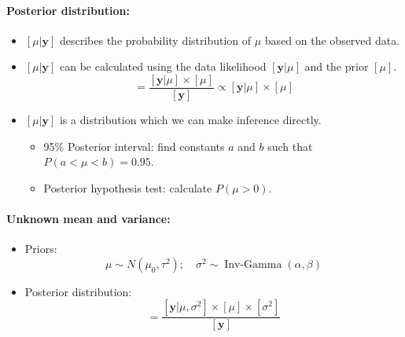\documentclass{article}
\begin{document}
\paragraph{Posterior distribution:}
\begin{itemize}
    \item $[\mu|\mathbf{y}]$ describes the probability distribution of $\mu$ based on the observed data.
    \item $[\mu|\mathbf{y}]$ can be calculated using the data likelihood $[\mathbf{y}|\mu]$ and the prior $[\mu]$.
    \begin{equation}
        [\mu|\mathbf{y}]=\frac{[\mathbf{y}|\mu]\times[\mu]}{[\mathbf{y}]} \propto [\mathbf{y}|\mu]\times[\mu]
    \end{equation}
    \item $[\mu|\mathbf{y}]$ is a distribution which we can make inference directly.
        \begin{itemize}
            \item 95\% Posterior interval: find constants $a$ and $b$ such that $P(a<\mu<b)=0.95$.
            \item Posterior hypothesis test: calculate $P(\mu>0)$.
        \end{itemize}
\end{itemize}

\paragraph{Unknown mean and variance:}
\begin{itemize}
    \item Priors: 
    \begin{equation}
        \mu\sim N(\mu_0, \tau^2); \quad \sigma^2\sim \operatorname{Inv-Gamma}(\alpha,\beta)
    \end{equation}
    \item Posterior distribution:
    \begin{equation}
        [\mu,\sigma^2|\mathbf{y}]=\frac{[\mathbf{y}|\mu,\sigma^2]\times[\mu]\times[\sigma^2]}{[\mathbf{y}]}
    \end{equation}
\end{itemize}
\end{document}
